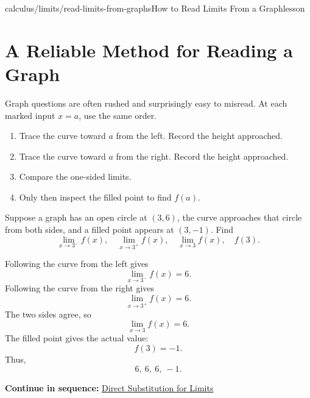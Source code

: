 \documentclass[11pt,openany]{book}
\theoremstyle{bgplain}
\newcounter{bgexample}[chapter]
\newcommand{\webnext}[2]{%
  \par\addvspace{1.2em}\noindent{\color{BGLine}\rule{\textwidth}{0.35pt}}\par\smallskip
  {\small\color{BGGray}\textbf{Continue in sequence:} \hyperlink{web:#1}{#2}}\par
}
\begin{document}
\begin{webpage}{calculus/limits/read-limits-from-graphs}{How to Read Limits From a Graph}{lesson}
\section{A Reliable Method for Reading a Graph}

Graph questions are often rushed and surprisingly easy to misread. At each marked input \(x=a\), use the same order.

\begin{bgmethod}[title={Graph-Reading Routine}]
\begin{enumerate}
  \item Trace the curve toward \(a\) from the left. Record the height approached.
  \item Trace the curve toward \(a\) from the right. Record the height approached.
  \item Compare the one-sided limits.
  \item Only then inspect the filled point to find \(f(a)\).
\end{enumerate}
\end{bgmethod}

\begin{bgexample}[title={Reading four quantities from one graph}]
Suppose a graph has an open circle at \((3,6)\), the curve approaches that circle from both sides, and a filled point appears at \((3,-1)\). Find
\[
  \lim_{x\to3^-}f(x),\quad
  \lim_{x\to3^+}f(x),\quad
  \lim_{x\to3}f(x),\quad
  f(3).
\]

\begin{bgsolution}
Following the curve from the left gives
\[
  \lim_{x\to3^-}f(x)=6.
\]
Following the curve from the right gives
\[
  \lim_{x\to3^+}f(x)=6.
\]
The two sides agree, so
\[
  \lim_{x\to3}f(x)=6.
\]
The filled point gives the actual value:
\[
  f(3)=-1.
\]
Thus,
\[
  \boxed{6,\ 6,\ 6,\ -1}.
\]
\end{bgsolution}
\end{bgexample}
\webnext{calculus/limits/direct-substitution}{Direct Substitution for Limits}
\end{webpage}
\end{document}

